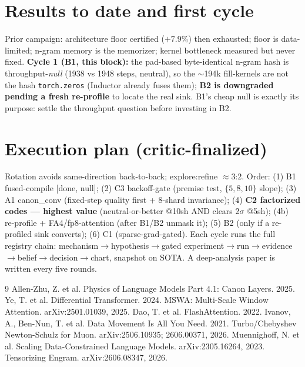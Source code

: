 \documentclass{article}
\begin{document}
\section{Results to date and first cycle}
Prior campaign: architecture floor certified ($+7.9\%$) then exhausted; floor is data-limited; n-gram memory is the memorizer; kernel bottleneck measured but never fixed. \textbf{Cycle 1 (B1, this block):} the pad-based byte-identical n-gram hash is throughput-\emph{null} (1938 vs 1948 steps, neutral), so the $\sim$194k fill-kernels are not the hash \texttt{torch.zeros} (Inductor already fuses them); \textbf{B2 is downgraded pending a fresh re-profile} to locate the real sink. B1's cheap null is exactly its purpose: settle the throughput question before investing in B2.

\section{Execution plan (critic-finalized)}
Rotation avoids same-direction back-to-back; explore:refine $\approx$3:2. Order: (1) B1 fused-compile [done, null]; (2) C3 backoff-gate (premise test, $\{5,8,10\}$ slope); (3) A1 canon\_conv (fixed-step quality first + 8-shard invariance); (4) \textbf{C2 factorized codes --- highest value} (neutral-or-better @10sh AND clears 2$\sigma$ @5sh); (4b) re-profile + FA4/fp8-attention (after B1/B2 unmask it); (5) B2 (only if a re-profiled sink converts); (6) C1 (sparse-grad-gated). Each cycle runs the full registry chain: mechanism$\to$hypothesis$\to$gated experiment$\to$run$\to$evidence$\to$belief$\to$decision$\to$chart, snapshot on SOTA. A deep-analysis paper is written every five rounds.


\begin{thebibliography}{9}
 Allen-Zhu, Z. et al. Physics of Language Models Part 4.1: Canon Layers. 2025.
 Ye, T. et al. Differential Transformer. 2024.
 MSWA: Multi-Scale Window Attention. arXiv:2501.01039, 2025.
 Dao, T. et al. FlashAttention. 2022.
 Ivanov, A., Ben-Nun, T. et al. Data Movement Is All You Need. 2021.
 Turbo/Chebyshev Newton-Schulz for Muon. arXiv:2506.10935; 2606.00371, 2026.
 Muennighoff, N. et al. Scaling Data-Constrained Language Models. arXiv:2305.16264, 2023.
 Tensorizing Engram. arXiv:2606.08347, 2026.
\end{thebibliography}
\end{document}
